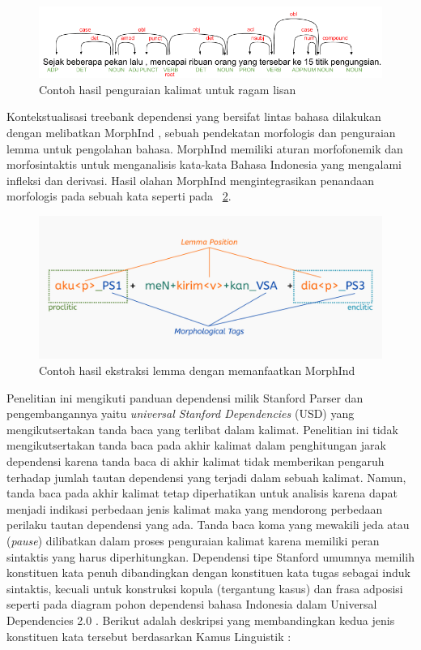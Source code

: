 \begin{figure}
	\centering \includegraphics[width=0.85
	\textwidth] {pics/contohlisan.png} \caption{Contoh hasil penguraian kalimat untuk ragam lisan} 
\label{fig:contohlisan} \end{figure}

Kontekstualisasi treebank dependensi yang bersifat lintas bahasa dilakukan dengan melibatkan MorphInd \citep{larasati2011indonesian}, sebuah pendekatan morfologis dan penguraian lemma untuk pengolahan bahasa. MorphInd memiliki aturan morfofonemik dan morfosintaktis untuk menganalisis kata-kata Bahasa Indonesia yang mengalami infleksi dan derivasi. Hasil olahan MorphInd mengintegrasikan penandaan morfologis pada sebuah kata seperti pada \pic~\ref{fig:morphind_schema}.

\begin{figure}
	\centering \includegraphics[width=1
	\textwidth] {pics/morphind_schema.png} \caption{Contoh hasil ekstraksi lemma dengan memanfaatkan MorphInd \citep{larasati2011indonesian} } 
\label{fig:morphind_schema} 
\end{figure}

Penelitian ini mengikuti panduan dependensi milik Stanford Parser \citep{de2008stanford} dan pengembangannya yaitu \textit{universal Stanford Dependencies} (USD) \citep{de2014universal} yang mengikutsertakan tanda baca yang terlibat dalam kalimat. Penelitian ini tidak mengikutsertakan tanda baca pada akhir kalimat dalam penghitungan jarak dependensi karena tanda baca di akhir kalimat tidak memberikan pengaruh terhadap jumlah tautan dependensi yang terjadi dalam sebuah kalimat. Namun, tanda baca pada akhir kalimat tetap diperhatikan untuk analisis karena dapat menjadi indikasi perbedaan jenis kalimat maka yang mendorong perbedaan perilaku tautan dependensi yang ada. Tanda baca koma yang mewakili jeda atau (\textit{pause}) dilibatkan dalam proses penguraian kalimat karena memiliki peran sintaktis yang harus diperhitungkan. Dependensi tipe Stanford \citep{de2008stanford} umumnya memilih konstituen kata penuh dibandingkan dengan konstituen kata tugas sebagai induk sintaktis, kecuali untuk konstruksi kopula (tergantung kasus) dan frasa adposisi seperti pada diagram pohon dependensi bahasa Indonesia dalam Universal Dependencies 2.0 \citep{nivre2017universal}. Berikut adalah deskripsi yang membandingkan kedua jenis konstituen kata tersebut berdasarkan Kamus Linguistik \citep{kridalaksana2008kamus}:

